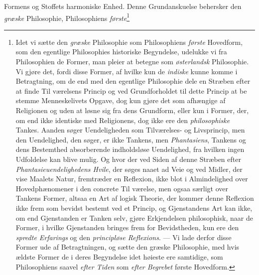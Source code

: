 Formens og Stoffets harmoniske Enhed. Denne Grundanskuelse
behersker den \emph{græske} Philosophie, Philosophiens \emph{første}\footnote{%
Idet vi sætte den \emph{græske} Philosophie som Philosophiens \emph{første}
Hovedform, som den egentlige Philosophies historiske Begyndelse,
udelukke vi fra Philosophien de Former, man pleier at betegne som
\emph{østerlandsk} Philosophie. Vi gjøre det, fordi disse Former, af
hvilke kun de \emph{indiske} kunne komme i Betragtning, om de end
med den egentlige Philosophie dele en Stræben efter at finde Til\-%
værelsens Princip og ved Grundforholdet til dette Princip at be\-%
stemme Menneskelivets Opgave, dog kun gjøre det som afhængige
af Religionen og uden at løsne sig fra dens Grundform, eller kun i
Former, der, om end ikke identiske med Religionens, dog ikke ere
den \emph{philosophiske} Tankes. Aanden søger Uendeligheden som
Tilværelses- og Livsprincip, men den Uendelighed, den søger, er
ikke Tankens, men \emph{Phantasiens}, Tankens og dens Bestemthed
absorberende indholdsløse Uendelighed, fra hvilken ingen Udfoldelse
kan blive mulig. Og hvor der ved Siden af denne Stræben efter
\emph{Phantasieuendelighedens Hvile}, der søges naaet ad Veie og
ved Midler, der vise Maalets Natur, fremtræder en Reflexion, ikke
blot i Almindelighed over Hovedphænomener i den concrete Til\-%
værelse, men ogsaa særligt over Tankens Former, altsaa en Art af
logisk Theorie, der kommer denne Reflexion ikke frem som bevidst
bestemt ved et Princip, og Gjenstandens Art kan ikke, om end
Gjenstanden er Tanken selv, gjøre Erkjendelsen philosophisk, naar de
Former, i hvilke Gjenstanden bringes frem for Bevidstheden, kun ere
den \emph{spredte Erfarings} og den \emph{principløse Reflexions}. --- Vi
lade derfor disse Former ude af Betragtningen, og sætte den græske
Philosophie, med hvis ældste Former de i deres Begyndelse idet\-%
høieste ere samtidige, som Philosophiens saavel \emph{efter Tiden} som
\emph{efter Begrebet} første Hovedform.}
